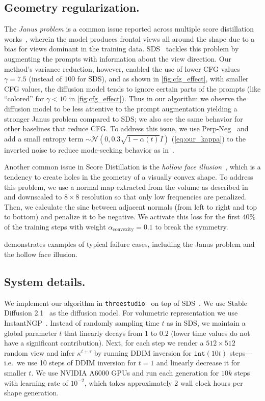 \subsection{Geometry regularization.}
The \emph{Janus problem} is a common issue reported across multiple score distillation works~\cite{poole2022dreamfusion, wang2024prolificdreamer, katzir2023noise}, wherein the model produces frontal views all around the shape due to a bias for views dominant in the training data.
SDS~\cite{poole2022dreamfusion} tackles this problem by augmenting the prompts with information about the view direction.
Our method's variance reduction, however, enabled the use of lower CFG values $\gamma=7.5$ (instead of $100$ for SDS), and as shown in \cref{fig:cfg_effect}, with smaller CFG values, the diffusion model tends to ignore certain parts of the prompts (like ``colored'' for $\gamma < 10$ in \cref{fig:cfg_effect}). 
%
Thus in our algorithm we observe the diffusion model to be less attentive to the prompt augmentation yielding a stronger Janus problem compared to SDS; we also see the same behavior for other baselines that reduce CFG. 
%
To address this issue, we use Perp-Neg~\cite{armandpour2023re} and add a small entropy term $\sim\mathcal N(0, 0.3\sqrt{1 - \alpha(t)}I)$ (\cref{eq:our_kappa}) to the inverted noise to reduce mode-seeking behavior as in~\cite{wang2023taming}.

Another common issue in Score Distillation is the \emph{hollow face illusion}~\cite{hill2007hollow}, which is a tendency to create holes in the geometry of a visually convex shape.
To address this problem, we use a normal map extracted from the volume as described in~\cite{poole2022dreamfusion} and downscaled to $8\times8$ resolution so that only low frequencies are penalized. 
Then, we calculate the sine between adjacent normals (from left to right and top to bottom) and penalize it to be negative.
We activate this loss for the first $40\%$ of the training steps with weight $\alpha_{\text{convexity}}=0.1$ to break the symmetry.

 demonstrates examples of typical failure cases, including the Janus problem and the hollow face illusion.


\subsection{System details.}
We implement our algorithm in \texttt{threestudio}~\cite{threestudio2023} on top of SDS~\cite{poole2022dreamfusion}.
We use Stable Diffusion 2.1~\cite{Rombach_2022_CVPR} as the diffusion model.
For volumetric representation 
we use InstantNGP~\cite{muller2022instant}.
Instead of randomly sampling time $t$ as in SDS, we maintain a global parameter $t$ that linearly decays from $1$ to $0.2$ (lower time values do not have a significant contribution).
Next, for each step we render a $512\times512$ random view and infer $\kappa^{t + \tau}$ by running DDIM inversion for $\texttt{int}(10t)$ steps---i.e.\ we use 10 steps of DDIM inversion for $t=1$ and linearly decrease it for smaller $t$.
We use NVIDIA A6000 GPUs and run each generation for $10k$ steps with learning rate of $10^{-2}$, which takes approximately 2 wall clock hours per shape generation.

